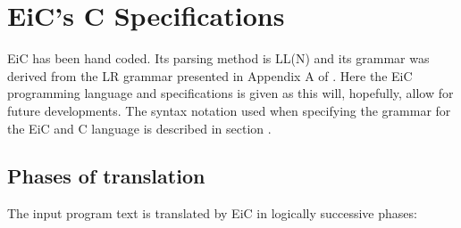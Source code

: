 
\chapter{EiC's C Specifications }
\label{chp:Specifications}

EiC has been hand coded.  Its parsing method is LL(N) and its
grammar was derived from the LR grammar presented in Appendix A of
\cite{kernighan-ritchie88}.  Here the EiC programming
language and specifications is given as this will, hopefully, allow
for future developments. The syntax notation used when specifying the
grammar for the EiC and C language is described in section
.

\section{Phases of translation}
\label{sec:PhasesTranslation}

The input program text is translated by EiC in logically successive phases:

